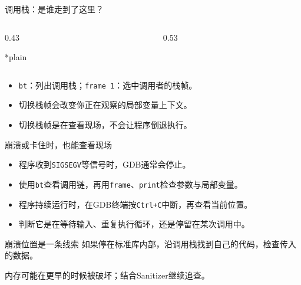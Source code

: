 \begin{frame}{调用栈：是谁走到了这里？}
    \begin{columns}[T]
        \begin{column}{0.43\textwidth}
            \begin{Code}*{plain}
                
            \end{Code}
        \end{column}
        \begin{column}{0.53\textwidth}
        \end{column}
    \end{columns}
    \medskip
    \begin{itemize}
        \item \texttt{bt}：列出调用栈；\texttt{frame 1}：选中调用者的栈帧。
        \item 切换栈帧会改变你正在观察的局部变量上下文。
        \item \alert{切换栈帧是在查看现场，不会让程序倒退执行。}
    \end{itemize}
\end{frame}

\begin{frame}{崩溃或卡住时，也能查看现场}
    \begin{itemize}
        \item 程序收到\texttt{SIGSEGV}等信号时，GDB通常会停止。
        \item 使用\texttt{bt}查看调用链，再用\texttt{frame}、\texttt{print}检查参数与局部变量。
        \item 程序持续运行时，在GDB终端按\texttt{Ctrl+C}中断，再查看当前位置。
        \item 判断它是在等待输入、重复执行循环，还是停留在某次调用中。
    \end{itemize}
    \medskip
    \begin{vspquotered}{崩溃位置是一条线索}
        如果停在标准库内部，沿调用栈找到自己的代码，检查传入的数据。\par
        内存可能在更早的时候被破坏；结合Sanitizer继续追查。
    \end{vspquotered}
\end{frame}

